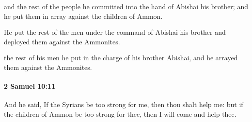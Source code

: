 			\begin{versebox}
					\item[BHS] 
					\item[ASV] and the rest of the people he committed into the hand of Abishai his brother; and he put them in array against the children of Ammon.
					\item[NIV] He put the rest of the men under the command of Abishai his brother and deployed them against the Ammonites.
					\item[NRSV] the rest of his men he put in the charge of his brother Abishai, and he arrayed them against the Ammonites.
			\end{versebox}

		\paragraph{2 Samuel 10:11} %
			\label{2SAMUEL-10-11}

			And he said, If the Syrians be too strong for me, then thou shalt help me: but if the children of Ammon be too strong for thee, then I will come and help thee.

